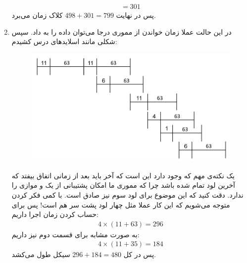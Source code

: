 \begin{enumerate}
\begin{gather*}
        = 301
    \end{gather*}
    پس در نهایت
    $498 + 301 = 799$
    کلاک زمان می‌برد.
    \item در این حالت عملا زمان خواندن از مموری درجا می‌توان داده را به  داد.
    سپس شکلی مانند اسلاید‌های درس کشیدم:
    \begin{figure}[H]
        \centering
        \includegraphics[scale=0.45]{pics/3-c.png}
    \end{figure}
    یک نکته‌ی مهم که وجود دارد این است که
    آخر باید بعد از زمانی اتفاق بیفتد که آخرین لود تمام شده باشد چرا که مموری ما امکان پشتیبانی از یک
     و 
    موازی را ندارد. دقت کنید که این موضوع برای لود سوم نیز صادق است.
    با کمی فکر کردن متوجه می‌شویم که این کار عملا مثل چهار لود پشت سر هم است!
    پس برای حساب کردن زمان اجرا داریم:
    \begin{gather*}
        4 \times (11 + 63) = 296
    \end{gather*}
    به صورت مشابه برای قسمت دوم نیز داریم:
    \begin{gather*}
        4 \times (11 + 35) = 184
    \end{gather*}
    پس در کل
    $296 + 184 = 480$
    سیکل طول می‌کشد.
\end{enumerate}